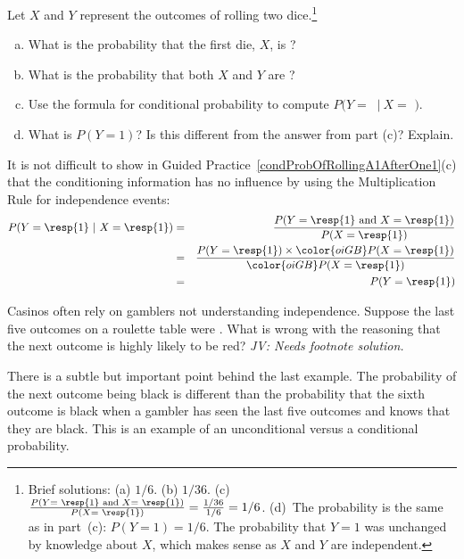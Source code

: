 \begin{doublespace}
\begin{exercise} \label{condProbOfRollingA1AfterOne1}
Let $X$ and $Y$ represent the outcomes of rolling two dice.\footnote{Brief solutions: (a) $1/6$. (b) $1/36$. (c)~$\frac{P(Y = \text{ \resp{1} and }X=\text{ \resp{1}})}{P(X=\text{ \resp{1}})} = \frac{1/36}{1/6} = 1/6$. (d)~The probability is the same as in part~(c): $P(Y=1)=1/6$. The probability that $Y=1$ was unchanged by knowledge about $X$, which makes sense as $X$ and $Y$ are independent.}
\begin{enumerate}[(a)]
\item What is the probability that the first die, $X$, is ?
\item What is the probability that both $X$ and $Y$ are ?
\item Use the formula for conditional probability to compute $P(Y =$ $\ |\ X = $ $)$.
\item What is $P(Y=1)$? Is this different from the answer from part (c)? Explain.
\end{enumerate}
\end{exercise}

\textC{\newpage}

It is not difficult to show in Guided Practice~\ref{condProbOfRollingA1AfterOne1}(c) that the conditioning information has no influence by using the Multiplication Rule for independence events:
\begin{eqnarray*}
P(Y=\text{\resp{1}}\ |\ X=\text{\resp{1}})
	&=& \frac{P(Y=\text{\resp{1} and }X=\text{\resp{1}})}{P(X=\text{\resp{1}})} \\
	&=& \frac{P(Y=\text{\resp{1}})\times \color{oiGB}P(X=\text{\resp{1}})}{\color{oiGB}P(X=\text{\resp{1}})} \\
	&=& P(Y=\text{\resp{1}}) \\
\end{eqnarray*}



\begin{exercise}
Casinos often rely on gamblers not understanding independence.  Suppose the last five outcomes on a roulette table were .  What is wrong with the reasoning that the next outcome is highly likely to be red? \textit{JV: Needs footnote solution.}
\end{exercise}

There is a subtle but important point behind the last example.  The probability of the next outcome being black is different than the probability that the sixth outcome is black when a gambler has seen the last five outcomes and knows that they are black.  This is an example of an unconditional versus a conditional probability.


\end{doublespace}
